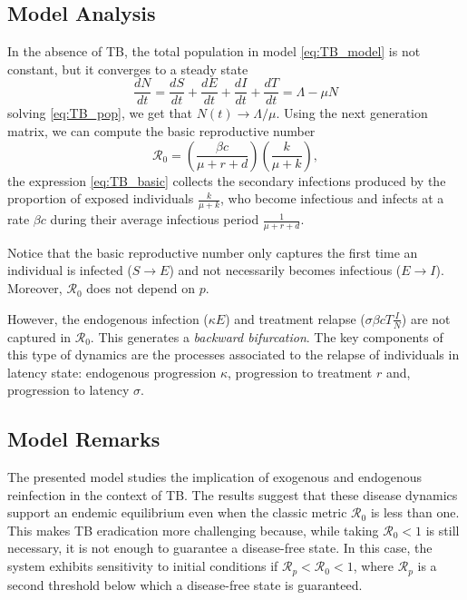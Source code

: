 \documentclass{book}\usepackage[]{graphicx}\usepackage[]{color}
\begin{document}
\subsection*{Model Analysis}
In the absence of TB, the total population in model \eqref{eq:TB_model} is not constant, but it converges to a steady state
\begin{equation} \label{eq:TB_pop}
\frac{dN}{dt}=\frac{dS}{dt}+\frac{dE}{dt}+\frac{dI}{dt}+\frac{dT}{dt}=\Lambda-\mu N
\end{equation}
solving \eqref{eq:TB_pop}, we get that $N(t)\rightarrow \Lambda/\mu$. Using the next generation matrix, we can compute the basic reproductive number
\begin{equation}\label{eq:TB_basic}
\mathcal{R}_0= \left(\frac{\beta c}{\mu+r+d}\right)\left(\frac{k}{\mu+k}\right),
\end{equation}
the expression \eqref{eq:TB_basic} collects the secondary infections produced by the proportion of exposed individuals $\frac{k}{\mu+k}$, who become infectious and infects  at a rate $\beta c$ during their average infectious period $\frac{1}{\mu+r+d}$.

Notice that the basic reproductive number only captures the first time an individual is infected ($S\rightarrow E$) and not necessarily becomes infectious ($E\rightarrow I$). Moreover, $\mathcal{R}_0$ does not depend on $p$.

However, the endogenous infection ($\kappa E$) and treatment relapse ($\sigma \beta c T \frac{I}{N}$) are not captured in $\mathcal{R}_0$. This generates a {\it backward bifurcation}.
%
The key components of this type of dynamics are the processes associated to the relapse of individuals in latency state: endogenous progression $\kappa$, progression to treatment $r$ and, progression to latency $\sigma$.

\subsection*{Model Remarks}
The presented model studies the implication of exogenous and endogenous reinfection in the context of TB. The results suggest that these disease dynamics support an endemic equilibrium even when the classic metric $\mathcal{R}_0$ is less than one. This makes TB eradication more challenging because, while taking $\mathcal{R}_0<1$ is still necessary, it is not enough to guarantee a disease-free state. In this case, the system exhibits sensitivity to initial conditions if $\mathcal{R}_p<\mathcal{R}_0<1$, where $\mathcal{R}_p$ is a second threshold below which a disease-free state is guaranteed.
\end{document}
